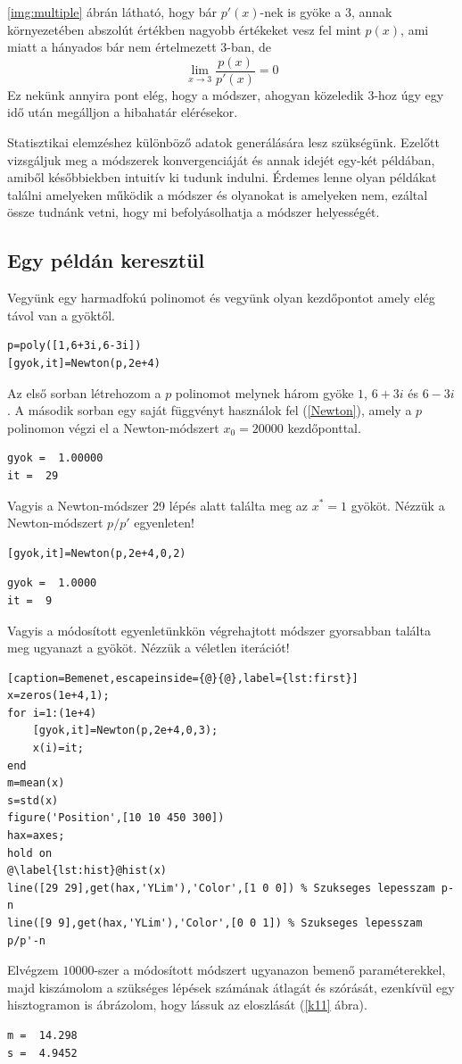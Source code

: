 \documentclass[a4paper,12pt]{report}
\begin{document}
			
			\ref{img:multiple} ábrán látható, hogy bár $p'(x)$-nek is gyöke a $3$, annak környezetében abszolút értékben nagyobb értékeket vesz fel mint $p(x)$, ami miatt a hányados bár nem értelmezett $3$-ban, de \[\lim_{x\to3}\frac{p(x)}{p'(x)}=0\]
				Ez nekünk annyira pont elég, hogy a módszer, ahogyan közeledik $3$-hoz úgy egy idő után megálljon a hibahatár elérésekor.

				Statisztikai elemzéshez különböző adatok generálására lesz szükségünk. Ezelőtt vizsgáljuk meg a módszerek konvergenciáját és annak idejét egy-két példában, amiből későbbiekben intuitív ki tudunk indulni. Érdemes lenne olyan példákat találni amelyeken működik a módszer és olyanokat is amelyeken nem, ezáltal össze tudnánk vetni, hogy mi befolyásolhatja a módszer helyességét.
				\subsection{Egy példán keresztül}
				Vegyünk egy harmadfokú polinomot és vegyünk olyan kezdőpontot amely elég távol van a gyöktől.
				\begin{lstlisting}[caption=Bemenet]
p=poly([1,6+3i,6-3i])
[gyok,it]=Newton(p,2e+4)
				\end{lstlisting}
				Az első sorban létrehozom a $p$ polinomot melynek három gyöke $1$, $6+3i$ és $6-3i$. A második sorban egy saját függvényt használok fel (\ref{Newton}), amely a $p$ polinomon végzi el a Newton-módszert $x_0=20000$ kezdőponttal.
				\begin{lstlisting}[caption=Eredmény]
gyok =  1.00000
it =  29
				\end{lstlisting}
				Vagyis a Newton-módszer 29 lépés alatt találta meg az $x^*=1$ gyököt. Nézzük a Newton-módszert $p/p'$ egyenleten!
				\begin{lstlisting}[caption=Bemenet]
[gyok,it]=Newton(p,2e+4,0,2)
				\end{lstlisting}
				\begin{lstlisting}[caption=Eredmény]
gyok =  1.0000
it =  9
				\end{lstlisting}
				Vagyis a módosított egyenletünkkön végrehajtott módszer gyorsabban találta meg ugyanazt a gyököt. Nézzük a véletlen iterációt!
				\begin{lstlisting}[caption=Bemenet,escapeinside={@}{@},label={lst:first}]
x=zeros(1e+4,1);
for i=1:(1e+4)
	[gyok,it]=Newton(p,2e+4,0,3);
	x(i)=it;
end
m=mean(x)
s=std(x)
figure('Position',[10 10 450 300])
hax=axes;
hold on
@\label{lst:hist}@hist(x)
line([29 29],get(hax,'YLim'),'Color',[1 0 0]) % Szukseges lepesszam p-n
line([9 9],get(hax,'YLim'),'Color',[0 0 1]) % Szukseges lepesszam p/p'-n
				\end{lstlisting}
				Elvégzem $10000$-szer a módosított módszert ugyanazon bemenő paraméterekkel, majd kiszámolom a szükséges lépések számának átlagát és szórását, ezenkívül egy hisztogramon is ábrázolom, hogy lássuk az eloszlását (\ref{k11} ábra).
				\begin{lstlisting}[caption=Eredmény]
m =  14.298
s =  4.9452
				\end{lstlisting}
				
\end{document}
